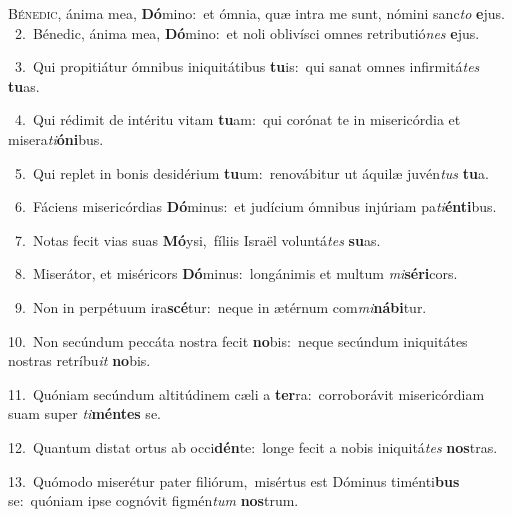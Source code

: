 \lettrine{\initial\textcolor{\initialcolor}{B}}{énedic,} ánima mea, \textbf{Dó}\-mino:~\star et ómnia, quæ intra me sunt, nómini sanc\textit{to} \textbf{e}\-jus.\\
{\numbfont\textcolor{\numbcolor}{~2.}}~Bénedic, ánima mea, \textbf{Dó}\-mino:~\star et noli oblivísci omnes retributió\textit{nes} \textbf{e}\-jus.\par
{\numbfont\textcolor{\numbcolor}{~3.}}~Qui propitiátur ómnibus iniquitátibus \textbf{tu}\-is:~\star qui sanat omnes infirmitá\textit{tes} \textbf{tu}\-as.\par
{\numbfont\textcolor{\numbcolor}{~4.}}~Qui rédimit de intéritu vitam \textbf{tu}\-am:~\star qui corónat te in misericórdia et misera\-\textit{ti}\-\textbf{ó}\textbf{ni}bus.\par
{\numbfont\textcolor{\numbcolor}{~5.}}~Qui replet in bonis desidérium \textbf{tu}\-um:~\star renovábitur ut áquilæ juvén\textit{tus} \textbf{tu}\-a.\par
{\numbfont\textcolor{\numbcolor}{~6.}}~Fáciens misericórdias \textbf{Dó}\-minus:~\star et judícium ómnibus injúriam pa\-\textit{ti}\-\textbf{én}\textbf{ti}bus.\par
{\numbfont\textcolor{\numbcolor}{~7.}}~Notas fecit vias suas \textbf{Mó}\-ysi,~\star fíliis Israël voluntá\textit{tes} \textbf{su}\-as.\par
{\numbfont\textcolor{\numbcolor}{~8.}}~Miserátor, et miséricors \textbf{Dó}\-minus:~\star longánimis et multum \textit{mi}\-\textbf{sé}\textbf{ri}cors.\par
{\numbfont\textcolor{\numbcolor}{~9.}}~Non in perpétuum ira\-\textbf{scé}\-tur:~\star neque in ætérnum com\-\textit{mi}\-\textbf{ná}\textbf{bi}tur.\par
{\numbfont\textcolor{\numbcolor}{10.}}~Non secúndum peccáta nostra fecit \textbf{no}\-bis:~\star neque secúndum iniquitátes nostras retríbu\textit{it} \textbf{no}\-bis.\par
{\numbfont\textcolor{\numbcolor}{11.}}~Quóniam secúndum altitúdinem cæli a \textbf{ter}\-ra:~\star corroborávit misericórdiam suam super \textit{ti}\-\textbf{mén}\textbf{tes} se.\par
{\numbfont\textcolor{\numbcolor}{12.}}~Quantum distat ortus ab occi\-\textbf{dén}\-te:~\star longe fecit a nobis iniquitá\textit{tes} \textbf{nos}\-tras.\par
{\numbfont\textcolor{\numbcolor}{13.}}~Quómodo miserétur pater filiórum,~\dagger misértus est Dóminus timénti\textbf{bus} se:~\star quóniam ipse cognóvit figmén\textit{tum} \textbf{nos}\-trum.\par
